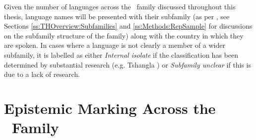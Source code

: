 Given the number of languages across the \lfam\ family discussed throughout this thesis, language names will be presented with their subfamily (as per , see Sections \ref{ss:THOverview:Subfamilies} and \ref{ss:Methods:RepSample} for discussions on the subfamily structure of the family) along with the country in which they are spoken. In cases where a language is not clearly a member of a wider subfamily, it is labelled as either \textit{Internal isolate} if the classification has been determined by substantial research (e.g. Tshangla \cite[Internal isolate: Bhutan][]{Grollmann2020}) or \textit{Subfamily unclear} if this is due to a lack of research.
\section{Epistemic Marking Across the \lfam\ Family}\label{s:Intro:Thesis}
